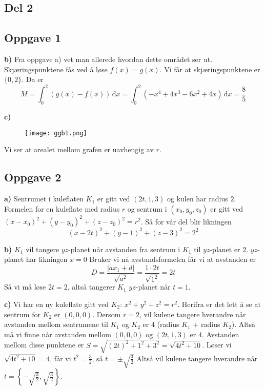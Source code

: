 \documentclass[12pt]{article}
\begin{document}
\begin{flushleft}
		\section{Del 2}
		\subsection{Oppgave 1}
		\textbf{b)} Fra oppgave a) vet man allerede hvordan dette området ser ut. Skjæringspunktene fås ved å løse $f(x)=g(x)$. Vi får at skjæringspunktene er $\{0,2\}$. Da er $$M=\int_0^2 (g(x)-f(x)) \, \text{d}x = \int_0^2 (-x^4+4x^3-6x^2+4x) \, \text{d}x = \frac85$$
		
		\textbf{c)} \\
		\begin{figure}[ht]
			\centering
			\texttt{[image: ggb1.png]}
		\end{figure}
		Vi ser at arealet mellom grafen er uavhengig av $r$.
		
		\subsection{Oppgave 2}
		\textbf{a)} Sentrumet i kuleflaten $K_1$ er gitt ved $(2t,1,3)$ og kulen har radius $2$. Formelen for en kuleflate med radius $r$ og sentrum i $(x_0,y_0,z_0)$ er gitt ved $(x-x_0)^2+(y-y_0)^2+(z-z_0)^2=r^2$. Så for vår del blir likningen $$(x-2t)^2+(y-1)^2+(z-3)^2=2^2$$ 
		
		\textbf{b)} $K_1$ vil tangere $yz$-planet når avstanden fra sentrum i $K_1$ til $yz$-planet er $2$. $yz$-planet har likningen $x=0$ Bruker vi nå avstandsformelen får vi at avstanden er $$D=\frac{|ax_1+d|}{\sqrt{a^2}} = \frac{1\cdot2t}{\sqrt{1^2}}=2t$$ Så vi må løse $2t=2$, altså tangerer $K_1$ $yz$-planet når $t=1$. \newline
		
		\textbf{c)} Vi har en ny kuleflate gitt ved $K_2:\, x^2+y^2+z^2=r^2$. Herifra er det lett å se at sentrum for $K_2$ er $(0,0,0)$. Dersom $r=2$, vil kulene tangere hverandre når avstanden mellom sentrumene til $K_1$ og $K_2$ er $4$ (radius $K_1$ + radius $K_2$). Altså må vi finne når avstanden mellom $(0,0,0)$ og $(2t,1,3)$ er $4$. Avstanden mellom disse punktene er $S=\sqrt{(2t)^2+1^2+3^2}=\sqrt{4t^2+10}$. Løser vi $\sqrt{4t^2+10}=4$, får vi $t^2=\frac32$, så $t=\pm \sqrt{\frac32}$ Altså vil kulene tangere hverandre når $t=\displaystyle \left \{-\sqrt{\frac{3}{2}}, \sqrt{\frac32}\right \}$. \newline
		

\end{flushleft}
\end{document}
